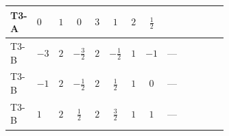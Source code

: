 \documentclass[8pt]{article}
\begin{document}
\begin{landscape}
\begin{longtable}{@{}llcccccc >{\raggedright\arraybackslash}p{0.21\linewidth} >{\raggedright\arraybackslash}p{0.21\linewidth} >{\raggedright\arraybackslash}p{0.21\linewidth}@{}}
\midrule
T3-A & $0$ & $1$ & $0$ & $3$ & $1$ & $2$ & $\frac{1}{2}$ & \scriptsize\adjustbox{max width=\linewidth}{$\begin{gathered} {\lambda_{12}^{(1)}} (4 T_{\nu}^{(1)}+2 T_{\nu}^{(2)}+4 {\lambda_{S_2}^{(A)}})\end{gathered}$} & \scriptsize\adjustbox{max width=\linewidth}{$\begin{gathered} -4 \operatorname{Tr}\!\left({y_1}\,\left({y_1}\right)^{\dagger}\,{y_2}\,\left({y_2}\right)^{\dagger}\right)\end{gathered}$} & \scriptsize\adjustbox{max width=\linewidth}{$\begin{gathered} +4 {\lambda_5} \left({\lambda_5}\right)^{*}\end{gathered}$} \\
\midrule
T3-B & $-3$ & $2$ & $-\frac{3}{2}$ & $2$ & $-\frac{1}{2}$ & $1$ & $-1$ & --- & \scriptsize\adjustbox{max width=\linewidth}{$\begin{gathered} -2 \operatorname{Tr}\!\left({y_1}\,\left({y_1}\right)^{\dagger}\,{y_2}\,\left({y_2}\right)^{\dagger}\right)\end{gathered}$} & \scriptsize\adjustbox{max width=\linewidth}{$\begin{gathered} +3 {\lambda_5} \left({\lambda_5}\right)^{*}\end{gathered}$} \\
\midrule
T3-B & $-1$ & $2$ & $-\frac{1}{2}$ & $2$ & $\frac{1}{2}$ & $1$ & $0$ & --- & \scriptsize\adjustbox{max width=\linewidth}{$\begin{gathered} -2 \operatorname{Tr}\!\left({y_1}\,\left({y_1}\right)^{\dagger}\,{y_2}\,\left({y_2}\right)^{\dagger}\right)\end{gathered}$} & \scriptsize\adjustbox{max width=\linewidth}{$\begin{gathered} +3 {\lambda_5} \left({\lambda_5}\right)^{*}\end{gathered}$} \\
\midrule
T3-B & $1$ & $2$ & $\frac{1}{2}$ & $2$ & $\frac{3}{2}$ & $1$ & $1$ & --- & \scriptsize\adjustbox{max width=\linewidth}{$\begin{gathered} -2 \operatorname{Tr}\!\left({y_1}\,\left({y_1}\right)^{\dagger}\,{y_2}\,\left({y_2}\right)^{\dagger}\right)\end{gathered}$} & \scriptsize\adjustbox{max width=\linewidth}{$\begin{gathered} +3 {\lambda_5} \left({\lambda_5}\right)^{*}\end{gathered}$} \\

\end{longtable}
\end{landscape}
\end{document}
